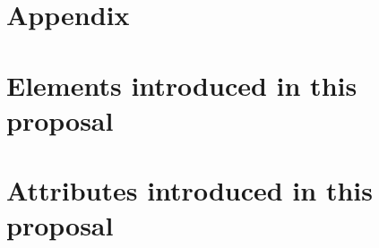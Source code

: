 \documentclass{cekarticle}
\begin{document}
\newpage
\section{Appendix}
\setcounter{secnumdepth}{2}
\appendix

\section{Elements introduced in this proposal}
\section{Attributes introduced in this proposal}



\end{document}
